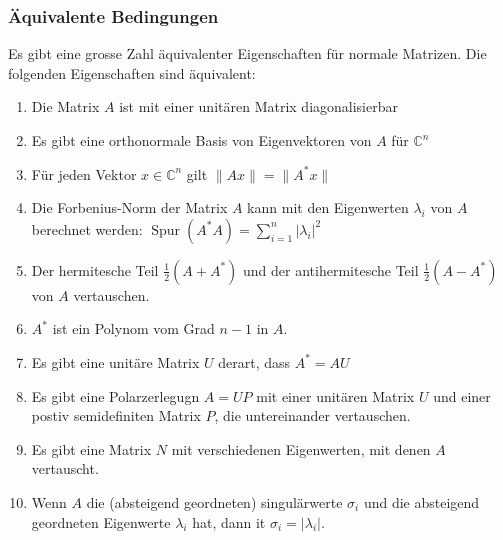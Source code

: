 \subsubsection{Äquivalente Bedingungen}
Es gibt eine grosse Zahl äquivalenter Eigenschaften für normale Matrizen.
Die folgenden Eigenschaften sind äquivalent:
\begin{enumerate}
\item
Die Matrix $A$ ist mit einer unitären Matrix diagonalisierbar
\item
Es gibt eine orthonormale Basis von Eigenvektoren von $A$ für $\mathbb{C}^n$
\item
Für jeden Vektor $x\in\mathbb{C}^n$ gilt $\|Ax\|=\|A^*x\|$
\item
Die Forbenius-Norm der Matrix $A$ kann mit den Eigenwerten $\lambda_i$
von $A$ berechnet werden:
$\operatorname{Spur}(A^*A) = \sum_{i=1}^n |\lambda_i|^2$
\item
Der hermitesche Teil $\frac12(A+A^*)$ und der antihermitesche Teil
$\frac12(A-A^*)$ von $A$ vertauschen.
\item
$A^*$ ist ein Polynom vom Grad $n-1$ in $A$.
\item
Es gibt eine unitäre Matrix $U$ derart, dass $A^*=AU$
\item
Es gibt eine Polarzerlegugn $A=UP$ mit einer unitären Matrix $U$ und
einer postiv semidefiniten Matrix $P$, die untereinander vertauschen.
\item
Es gibt eine Matrix $N$ mit verschiedenen Eigenwerten, mit denen $A$
vertauscht.
\item
Wenn $A$ die (absteigend geordneten) singulärwerte $\sigma_i$ und
die absteigend geordneten Eigenwerte $\lambda_i$ hat,
dann it $\sigma_i=|\lambda_i|$.
\end{enumerate}




